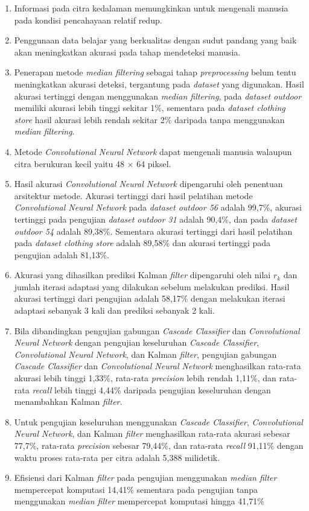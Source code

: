 \begin{enumerate}
\item Informasi pada citra kedalaman memungkinkan untuk mengenali manusia pada kondisi pencahayaan relatif redup.
\item Penggunaan data belajar yang berkualitas dengan sudut pandang yang baik akan meningkatkan akurasi pada tahap mendeteksi manusia.
\item Penerapan metode \textit{median filtering} sebagai tahap \textit{preprocessing} belum tentu meningkatkan akurasi deteksi, tergantung pada \textit{dataset} yang digunakan. Hasil akurasi tertinggi dengan menggunakan \textit{median filtering}, pada \textit{dataset outdoor} memiliki akurasi lebih tinggi sekitar 1\%, sementara pada \textit{dataset clothing store} hasil akurasi lebih rendah sekitar 2\% daripada tanpa menggunakan \textit{median filtering}.
\item Metode \textit{Convolutional Neural Network} dapat mengenali manusia walaupun citra berukuran kecil yaitu 48 $\times$ 64 piksel.
\item Hasil akurasi \textit{Convolutional Neural Network} dipengaruhi oleh penentuan arsitektur metode. Akurasi tertinggi dari hasil pelatihan metode \textit{Convolutional Neural Network} pada \textit{dataset outdoor 56} adalah 99,7\%, akurasi tertinggi pada pengujian \textit{dataset outdoor 31} adalah 90,4\%, dan pada \textit{dataset outdoor 54} adalah 89,38\%. Sementara akurasi tertinggi dari hasil pelatihan pada \textit{dataset clothing store} adalah 89,58\% dan akurasi tertinggi pada pengujian adalah 81,13\%.
\item Akurasi yang dihasilkan prediksi Kalman \textit{filter} dipengaruhi oleh nilai $r_{k}$ dan jumlah iterasi adaptasi yang dilakukan sebelum melakukan prediksi. Hasil akurasi tertinggi dari pengujian adalah 58,17\% dengan melakukan iterasi adaptasi sebanyak 3 kali dan prediksi sebanyak 2 kali.
\item Bila dibandingkan pengujian gabungan \textit{Cascade Classifier} dan \textit{Convolutional Neural Network} dengan pengujian keseluruhan \textit{Cascade Classifier}, \textit{Convolutional Neural Network}, dan Kalman \textit{filter}, pengujian gabungan \textit{Cascade Classifier} dan \textit{Convolutional Neural Network} menghasilkan rata-rata akurasi lebih tinggi 1,33\%, rata-rata \textit{precision} lebih rendah 1,11\%, dan rata-rata \textit{recall} lebih tinggi 4,44\% daripada pengujian keseluruhan dengan menambahkan Kalman \textit{filter}. 
\item Untuk pengujian keseluruhan menggunakan \textit{Cascade Classifier}, \textit{Convolutional Neural Network}, dan Kalman \textit{filter} menghasilkan rata-rata akurasi sebesar 77,7\%, rata-rata \textit{precision} sebesar 79,44\%, dan rata-rata \textit{recall} 91,11\% dengan waktu proses rata-rata per citra adalah 5,388 milidetik.
\item Efisiensi dari Kalman \textit{filter} pada pengujian menggunakan \textit{median filter} mempercepat komputasi 14,41\% sementara pada pengujian tanpa menggunakan \textit{median filter} mempercepat komputasi hingga 41,71\%
\end{enumerate}

